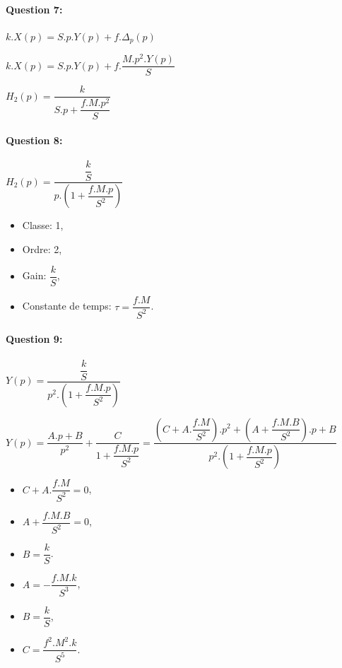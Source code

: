 \paragraph{Question 7:}

$k.X(p)=S.p.Y(p)+f.\Delta_p(p)$

$k.X(p)=S.p.Y(p)+f.\dfrac{M.p^2.Y(p)}{S}$

$H_2(p)=\dfrac{k}{S.p+\dfrac{f.M.p^2}{S}}$

\paragraph{Question 8:}

$H_2(p)=\dfrac{\dfrac{k}{S}}{p.\left(1+\dfrac{f.M.p}{S^2}\right)}$

\begin{itemize}
 \item Classe: 1,
 \item Ordre: 2,
 \item Gain: $\dfrac{k}{S}$,
 \item Constante de temps: $\tau=\dfrac{f.M}{S^2}$.
\end{itemize}

\paragraph{Question 9:}

$Y(p)=\dfrac{\dfrac{k}{S}}{p^2.\left(1+\dfrac{f.M.p}{S^2}\right)}$

$Y(p)=\dfrac{A.p+B}{p^2}+\dfrac{C}{1+\dfrac{f.M.p}{S^2}}=\dfrac{\left(C+A.\dfrac{f.M}{S^2}\right).p^2+\left(A+\dfrac{f.M.B}{S^2}\right).p+B}{p^2.\left(1+\dfrac{f.M.p}{S^2}\right)}$

\begin{minipage}{0.49\linewidth}
\begin{itemize}
 \item $C+A.\dfrac{f.M}{S^2}=0$,
 \item $A+\dfrac{f.M.B}{S^2}=0$,
 \item $B=\dfrac{k}{S}$.
\end{itemize}
\end{minipage}\hfill
\begin{minipage}{0.49\linewidth}
\begin{itemize}
 \item $A=-\dfrac{f.M.k}{S^3}$,
 \item $B=\dfrac{k}{S}$,
 \item $C=\dfrac{f^2.M^2.k}{S^5}$.
\end{itemize}
\end{minipage}

